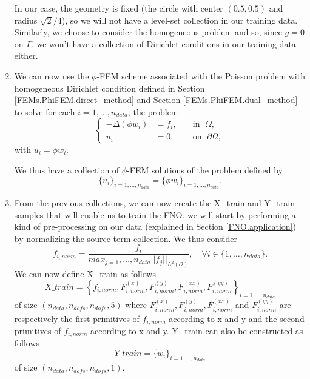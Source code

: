 \begin{enumerate}[label=\textbullet]
	In our case, the geometry is fixed (the circle with center $(0.5,0.5)$ and radius $\sqrt{2}/4$), so we will not have a level-set collection in our training data. Similarly, we choose to consider the homogeneous problem and so, since $g=0$ on $\Gamma$, we won't have a collection of Dirichlet conditions in our training data either.
	
	\item We can now use the $\phi$-FEM scheme associated with the Poisson problem with homogeneous Dirichlet condition defined in Section \ref{FEMs.PhiFEM.direct_method} and Section \ref{FEMs.PhiFEM.dual_method} to solve for each $i=1,\dots,n_{data}$, the problem
	\begin{equation*}
		\left\{
		\begin{aligned}
			-\Delta (\phi w_i) &= f_i, \; &&\text{in } \; \Omega, \\
			u_i&=0, \; &&\text{on } \; \partial\Omega,
		\end{aligned}
		\right.
	\end{equation*}
	with $u_i=\phi w_i$.
	
	We thus have a collection of $\phi$-FEM solutions of the problem defined by
	\begin{equation*}
		\{u_i\}_{i=1,\dots,n_{data}}=\{\phi w_i\}_{i=1,\dots,n_{data}}.
	\end{equation*}
	
	\item From the previous collections, we can now create the X\_train and Y\_train samples that will enable us to train the FNO. we will start by performing a kind of pre-processing on our data (explained in Section \ref{FNO.application}) by normalizing the source term collection. We thus consider
	\begin{equation*}
		f_{i,norm} = \frac{f_i}{max_{j=1},\dots,n_{data} ||f_j||_{L^2(\mathcal{O})}}, \quad \forall i\in \{1,\dots,n_{data}\}.
	\end{equation*}
	We can now define X\_train as follows
	\begin{equation*}
		X\_train =  \left\{f_{i,norm},F_{i,norm}^{(x)},F_{i,norm}^{(y)},F_{i,norm}^{(xx)},F_{i,norm}^{(yy)}\right\}_{i=1,\dots,n_{data}}
	\end{equation*}
	of size $(n_{data},n_{dofs},n_{dofs},5)$ where $F_{i,norm}^{(x)},F_{i,norm}^{(y)},F_{i,norm}^{(xx)}$ and $F_{i,norm}^{(yy)}$ are respectively the first primitives of $f_{i,norm}$ according to x and y and the second primitives of $f_{i,norm}$ according to x and y.
	Y\_train can also be constructed as follows
	\begin{equation*}
		Y\_train = \{w_i\}_{i=1,\dots,n_{data}}
	\end{equation*}
	of size $(n_{data},n_{dofs},n_{dofs},1)$.
	

\end{enumerate}
